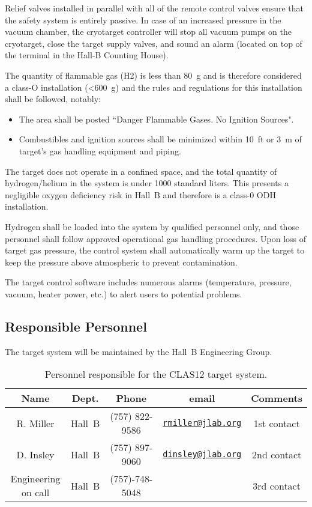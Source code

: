Relief valves installed in parallel with all of the remote control valves ensure that the 
safety system is entirely passive. In case of an increased pressure in the vacuum chamber, 
the cryotarget controller will stop all vacuum pumps on the cryotarget, close the 
target supply valves, and sound an alarm (located on top of the terminal 
in the Hall-B Counting House).

The quantity of flammable gas (H2) is less than 80~g and is therefore considered a class-O 
installation (<600~g) and the rules and regulations for this installation shall be followed, 
notably:

\begin{itemize}

\item The area shall be posted ``Danger Flammable Gases.  No Ignition Sources".

\item Combustibles and ignition sources shall be minimized within 10~ft or 3~m of target's gas 
handling equipment and piping.
\end{itemize}

The target does not operate in a confined space, and the total quantity of hydrogen/helium in 
the system is under 1000 standard liters. This presents a negligible oxygen deficiency risk in 
Hall~B and therefore is a class-0 ODH installation.

Hydrogen shall be loaded into the system by qualified personnel only, and those personnel shall 
follow approved operational gas handling procedures.   Upon loss of target gas pressure, the 
control system shall automatically warm up the target to keep the pressure above atmospheric to 
prevent contamination. 

The target control software includes numerous alarms (temperature, pressure, vacuum, heater 
power, etc.) to alert users to potential problems. 


\subsection{Responsible Personnel}

The target system will be maintained by the Hall~B Engineering Group.  

\begin{table}[!htb]
\centering
\begin{tabular}{|c|c|c|c|c|}
\hline
 Name&Dept.&Phone&email&Comments \\ \hline
R. Miller &Hall~B&(757) 822-9586&\href{mailto:rmiller@jlab.org}{\nolinkurl{rmiller@jlab.org}} &1st contact \\ \hline
D. Insley & Hall~B&(757) 897-9060&\href{mailto:dinsley@jlab.org}{\nolinkurl{dinsley@jlab.org}}  &2nd contact \\ \hline
Engineering on call & Hall~B&(757)-748-5048&& 3rd contact  \\ \hline
\end{tabular}
\caption{Personnel responsible for the CLAS12 target system.} 
\label{tb:target}
\end{table}
